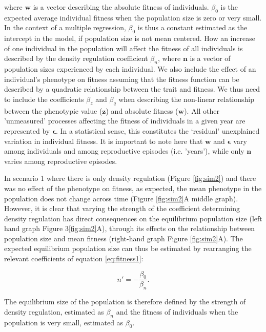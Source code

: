 \documentclass{article}
\begin{document}
\noindent where $\mathbf{w}$ is a vector describing the absolute fitness of individuals. $\beta_{0}$ is the expected average individual fitness when the population size is zero or very small. In the context of a multiple regression, $\beta_{0}$ is thus a constant estimated as the intercept in the model, if population size is not mean centered. How an increase of one individual in the population will affect the fitness of all individuals is described by the density regulation coefficient $\beta_{n}$, where $\mathbf{n}$ is a vector of population sizes experienced by each individual. We also include the effect of an individual's phenotype on fitness assuming that the fitness function can be described by a quadratic relationship between the trait and fitness. We thus need to include the coefficients $\beta_{z}$ and $\beta_{q}$ when describing the non-linear relationship between the phenotypic value ($\mathbf{z}$) and absolute fitness ($\mathbf{w}$). All other 'unmeasured' processes affecting the fitness of individuals in a given year are represented by $ \mathbf{\epsilon}$. In a statistical sense, this constitutes the `residual' unexplained variation in individual fitness. It is important to note here that $\mathbf{w}$ and $\mathbf{\epsilon}$ vary among individuals and among reproductive episodes (i.e. 'years'), while only $\mathbf{n}$ varies among reproductive episodes.

In scenario 1 where there is only density regulation (Figure \ref{fig:sim2}) and there was no effect of the phenotype on fitness, as expected, the mean phenotype in the population does not change across time (Figure \ref{fig:sim2}A middle graph). However, it is clear that varying the strength of the coefficient determining density regulation has direct consequences on the equilibrium population size (left hand graph Figure 3\ref{fig:sim2}A), through its effects on the relationship between population size and mean fitness (right-hand graph Figure \ref{fig:sim2}A). The expected equilibrium population size can thus be estimated by rearranging the relevant coefficients of equation \ref{eq:fitness1}:

\begin{equation}\label{eq:equilibrium}
n'=-\frac{\beta_{0}}{\beta_n}. 
\end{equation} 

\noindent The equilibrium size of the population is therefore defined by the strength of density regulation, estimated as $\beta_n$ and the fitness of individuals when the population is very small, estimated as $\beta_0$. 
\end{document}

